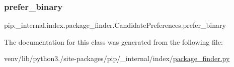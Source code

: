 \subsubsection{\texorpdfstring{prefer\+\_\+binary}{prefer\_binary}}
{\footnotesize\ttfamily pip.\+\_\+internal.\+index.\+package\+\_\+finder.\+Candidate\+Preferences.\+prefer\+\_\+binary\hspace{0.3cm}{\ttfamily [static]}}



The documentation for this class was generated from the following file\+:\begin{DoxyCompactItemize}
\item 
venv/lib/python3./site-\/packages/pip/\+\_\+internal/index/\hyperlink{package__finder_8py}{package\+\_\+finder.\+py}\end{DoxyCompactItemize}
